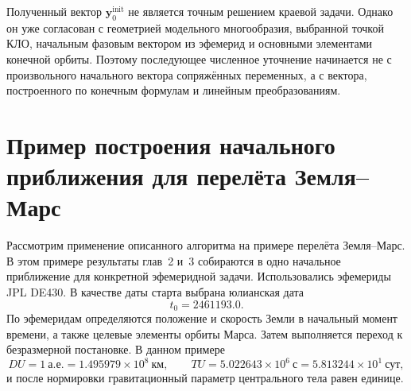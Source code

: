 Полученный вектор \(\mathbf y_0^{\mathrm{init}}\) не является точным решением краевой задачи. Однако он уже согласован с геометрией модельного многообразия, выбранной точкой КЛО, начальным фазовым вектором из эфемерид и основными элементами конечной орбиты. Поэтому последующее численное уточнение начинается не с произвольного начального вектора сопряжённых переменных, а с вектора, построенного по конечным формулам и линейным преобразованиям.

\section{Пример построения начального приближения для перелёта Земля--Марс}

Рассмотрим применение описанного алгоритма на примере перелёта Земля--Марс. В этом примере результаты глав~2 и~3 собираются в одно начальное приближение для конкретной эфемеридной задачи. Использовались эфемериды JPL DE430.
В качестве даты старта выбрана юлианская дата
\begin{equation}
t_0=2461193.0.
\end{equation}
По эфемеридам определяются положение и скорость Земли в начальный момент времени, а также целевые элементы орбиты Марса. Затем выполняется переход к безразмерной постановке. В данном примере
\begin{equation}
DU=1~\text{а.е.}=1.495979\times10^{8}~\text{км},
\qquad
TU=5.022643\times10^{6}~\text{с}=5.813244\times10^{1}~\text{сут},
\end{equation}
и после нормировки гравитационный параметр центрального тела равен единице.

